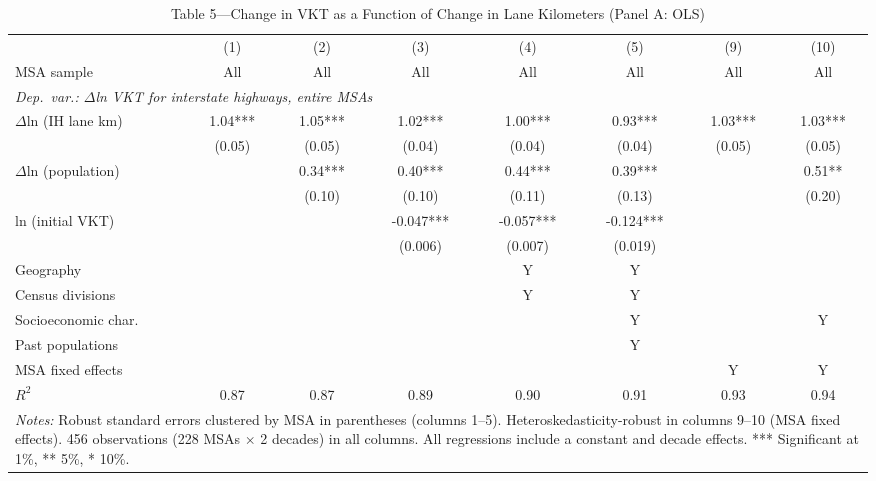 \begin{table}[htbp]
\centering
\small
\caption{Table 5---Change in VKT as a Function of Change in Lane Kilometers (Panel A: OLS)}
\label{tab:table5a}
\begin{tabular}{lccccccc}
\toprule
 & (1) & (2) & (3) & (4) & (5) & (9) & (10) \\
MSA sample & All & All & All & All & All & All & All \\
\midrule
\multicolumn{8}{l}{\textit{Dep.\ var.: $\Delta$ln VKT for interstate highways, entire MSAs}} \\
\addlinespace
$\Delta$ln (IH lane km) & 1.04*** & 1.05*** & 1.02*** & 1.00*** & 0.93*** & 1.03*** & 1.03*** \\
 & (0.05) & (0.05) & (0.04) & (0.04) & (0.04) & (0.05) & (0.05) \\
$\Delta$ln (population) & & 0.34*** & 0.40*** & 0.44*** & 0.39*** & & 0.51** \\
 & & (0.10) & (0.10) & (0.11) & (0.13) & & (0.20) \\
ln (initial VKT) & & & -0.047*** & -0.057*** & -0.124*** & & \\
 & & & (0.006) & (0.007) & (0.019) & & \\
\addlinespace
Geography             & & & & Y & Y & & \\
Census divisions      & & & & Y & Y & & \\
Socioeconomic char.   & & & & & Y & & Y \\
Past populations      & & & & & Y & & \\
MSA fixed effects     & & & & & & Y & Y \\
\addlinespace
$R^2$ & 0.87 & 0.87 & 0.89 & 0.90 & 0.91 & 0.93 & 0.94 \\
\bottomrule
\multicolumn{8}{p{0.95\linewidth}}{\footnotesize
 \textit{Notes:} Robust standard errors clustered by MSA in parentheses
 (columns 1--5). Heteroskedasticity-robust in columns 9--10 (MSA fixed effects).
 456 observations (228 MSAs $\times$ 2 decades) in all columns.
 All regressions include a constant and decade effects.
 *** Significant at 1\%, ** 5\%, * 10\%.}
\end{tabular}
\end{table}
